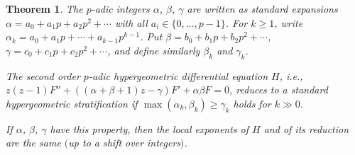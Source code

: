 \documentclass[10pt,a4paper]{amsart}
\numberwithin{equation}{section}
\newtheorem{Theorem}{Theorem}[section]
\begin{document}
 \begin{Theorem} \label{3.6} The $p$-adic integers $\alpha$, $\beta$, $\gamma$ are written as standard expansions $\alpha =a_0+a_1p+a_2p^2+\cdots$ with all $a_i\in \{0,\dots ,p-1\}$. For $k\geq 1$, write $\alpha_k=a_0+a_1p+\cdots +a_{k-1}p^{k-1}$. Put $\beta =b_0+b_1p+b_2p^2+\cdots$, $\gamma =c_0+c_1p+c_2p^2+\cdots$, and define similarly $\beta_k$ and $\gamma_k$.

The second order $p$-adic hypergeometric differential equation $H$, i.e., $ z(z-1)F''+((\alpha +\beta +1)z-\gamma )F'+\alpha \beta F=0$, reduces to a standard hypergeometric stratification if $\max(\alpha_k,\beta_k)\geq \gamma_k$ holds for $k\gg 0$.

If $\alpha$, $\beta$, $\gamma $ have this property, then the local exponents of $H$ and of its reduction are the same $($up to a shift over integers$)$.
 \end{Theorem}
\end{document}
